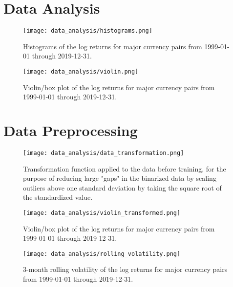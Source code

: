 \section{Data Analysis}
\begin{figure}
    \begin{center}
        \texttt{[image: data\_analysis/histograms.png]}
    \end{center}
    \caption{Histograms of the log returns for major currency pairs from 1999-01-01 through 2019-12-31.}
    \label{fig:histograms_raw}
\end{figure}

\begin{figure}
    \begin{center}
        \texttt{[image: data\_analysis/violin.png]}
    \end{center}
    \caption{Violin/box plot of the log returns for major currency pairs from 1999-01-01 through 2019-12-31.}
    \label{fig:violin_raw}
\end{figure}

\section{Data Preprocessing}


\begin{figure}
    \begin{center}
        \texttt{[image: data\_analysis/data\_transformation.png]}
    \end{center}
    \caption{Transformation function applied to the data before training, for the purpose of reducing large "gaps" in the binarized data by scaling outliers above one standard deviation by taking the square root of the standardized value.}
    \label{fig:data_transformation}
\end{figure}

\begin{figure}
    \begin{center}
        \texttt{[image: data\_analysis/violin\_transformed.png]}
    \end{center}
    \caption{Violin/box plot of the log returns for major currency pairs from 1999-01-01 through 2019-12-31.}
    \label{fig:violin_transformed}
\end{figure}

\begin{figure}
    \begin{center}
        \texttt{[image: data\_analysis/rolling\_volatility.png]}
    \end{center}
    \caption{3-month rolling volatility of the log returns for major currency pairs from 1999-01-01 through 2019-12-31.}
    \label{fig:rolling_volatility}
\end{figure}
